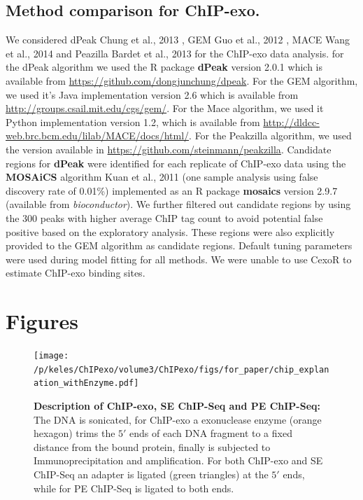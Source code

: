 \documentclass{bmcart}\usepackage[]{graphicx}\usepackage[]{color}
\begin{document}
\subsection*{Method comparison for ChIP-exo.}

We considered dPeak Chung et al., 2013 \cite{dpeak}, GEM Guo et al.,
2012 \cite{gem}, MACE Wang et al., 2014 \cite{mace} and Peazilla
Bardet et al., 2013 \cite{peakzilla} for the ChIP-exo data
analysis. for the dPeak algorithm we used the R package \textbf{dPeak}
version 2.0.1 which is available from
\url{https://github.com/dongjunchung/dpeak}. For the GEM algorithm, we
used it's Java implementation version 2.6 which is available from
\url{http://groups.csail.mit.edu/cgs/gem/}. For the Mace algorithm, we
used it Python implementation version 1.2, which is available from
\url{http://dldcc-web.brc.bcm.edu/lilab/MACE/docs/html/}. For the
Peakzilla algorithm, we used the version available in
\url{https://github.com/steinmann/peakzilla}. Candidate regions for
\textbf{dPeak} were identified for each replicate of ChIP-exo data
using the \textbf{MOSAiCS} algorithm Kuan et al., 2011 \cite{mosaics}
(one sample analysis using false discovery rate of 0.01\%)
implemented as an R package \textbf{mosaics} version 2.9.7 (available
from \emph{bioconductor}). We further filtered out candidate regions
by using the 300 peaks with higher average ChIP tag count to
avoid potential false positive based on the exploratory
analysis. These regions were also explicitly provided to the GEM
algorithm as candidate regions. Default tuning parameters were used
during model fitting for all methods. We were unable to use CexoR
\cite{cexor} to estimate ChIP-exo binding sites.


\nocite{exo_gb}
\nocite{maplot1}
\nocite{maplot2}
\nocite{chipbeyond}



\newpage

\section{Figures}


\begin{figure}[h!]
  \centering
  \texttt{[image: /p/keles/ChIPexo/volume3/ChIPexo/figs/for\_paper/chip\_explanation\_withEnzyme.pdf]}
  \caption{\textbf{Description of ChIP-exo, SE ChIP-Seq and PE
      ChIP-Seq:} The DNA is sonicated, for ChIP-exo a exonuclease
    enzyme (orange hexagon) trims the $5\prime$ ends of each DNA
    fragment to a fixed distance from the bound protein, finally is
    subjected to Immunoprecipitation and amplification. For both
    ChIP-exo and SE ChIP-Seq an adapter is ligated (green triangles)
    at the $5\prime$ ends, while for PE ChIP-Seq is ligated to both
    ends.}
  \label{fig:chip_diagram}
\end{figure}
\newpage
\end{document}
